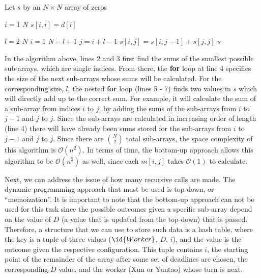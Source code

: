     \begin{spacing}{1.2}
        \begin{codebox}
            \li Let $s$ by an $N \times N$ array of zeros

            \li \For $i = 1$ \To $N$
            \Do
                \li $s[i, i] = d[i]$
            \End

            \li \For $l = 2$ \To $N$
            \Do
                \li \For $i = 1$ \To $N - l + 1$
                \Do
                    \li $j = i + l - 1$
                    \li $s[i, j] = s[i, j - 1] + s[j, j]$
                \End
            \End
            \li \Return $s$
        \end{codebox}
    \end{spacing}
    \vspace{5mm}
    In the algorithm above, lines 2 and 3 first find the sums of the smallest possible sub-arrays, which are single indices.
    From there, the \textbf{for} loop at line 4 specifies the size of the next sub-arrays whose sums will be calculated.
    For the corresponding size, $l$, the nested \textbf{for} loop (lines 5 - 7) finds two values in $s$ which will directly add up to the correct sum.
    For example, it will calculate the sum of a sub-array from indices $i$ to $j$, by adding the sums of the sub-arrays from $i$ to $j - 1$ and $j$ to $j$.
    Since the sub-arrays are calculated in increasing order of length (line 4) there will have already been sums stored for the sub-arrays from $i$ to $j - 1$ and $j$ to $j$.
    Since there are $\binom{N}{2}$ total sub-arrays, the space complexity of this algorithm is $\mathcal{O}(n^2)$.
    In terms of time, the bottom-up approach allows this algorithm to be $\mathcal{O}(n^2)$ as well, since each $m[i, j]$ takes $\mathcal{O}(1)$ to calculate.

    Next, we can address the issue of how many recursive calls are made.
    The dynamic programming approach that must be used is top-down, or ``memoization''.
    It is important to note that the bottom-up approach can not be used for this task since the possible outcomes given a specific sub-array depend on the value of $D$ (a value that is updated from the top-down) that is passed.
    Therefore, a structure that we can use to store such data is a hash table, where the key is a tuple of three values ($\id{Worker}$, $D$, $i$), and the value is the outcome given the respective configuration.
    This tuple contains $i$, the starting point of the remainder of the array after some set of deadlines are chosen, the corresponding $D$ value, and the worker (Xun or Yuntao) whose turn is next.

